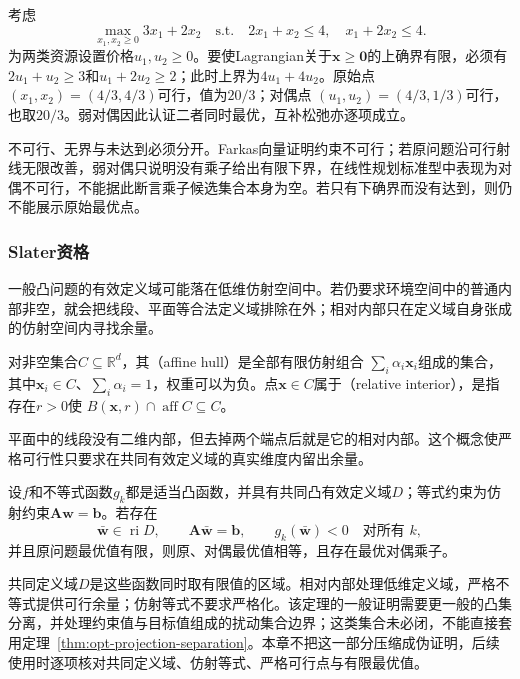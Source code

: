 \begin{example}[二维资源分配的原始与对偶证书]
\label{ex:opt-resource-lp-duality}
考虑
\[
 \max_{x_1,x_2\geq0}3x_1+2x_2
 \quad\text{s.t.}\quad
 2x_1+x_2\leq4,\quad x_1+2x_2\leq4.
\]
为两类资源设置价格$u_1,u_2\geq0$。要使Lagrangian关于$\bm x\geq\bm0$的上确界有限，必须有
$2u_1+u_2\geq3$和$u_1+2u_2\geq2$；此时上界为$4u_1+4u_2$。原始点
$(x_1,x_2)=(4/3,4/3)$可行，值为$20/3$；对偶点
$(u_1,u_2)=(4/3,1/3)$可行，也取$20/3$。弱对偶因此认证二者同时最优，互补松弛亦逐项成立。
\end{example}

不可行、无界与未达到必须分开。Farkas向量证明约束不可行；若原问题沿可行射线无限改善，弱对偶只说明没有乘子给出有限下界，在线性规划标准型中表现为对偶不可行，不能据此断言乘子候选集合本身为空。若只有下确界而没有达到，则仍不能展示原始最优点。

\subsubsection{Slater资格}

一般凸问题的有效定义域可能落在低维仿射空间中。若仍要求环境空间中的普通内部非空，就会把线段、平面等合法定义域排除在外；相对内部只在定义域自身张成的仿射空间内寻找余量。

\begin{definition}[仿射包与相对内部]
\label{def:opt-affine-hull-relative-interior}
对非空集合$C\subseteq\mathbb R^d$，其（affine hull）是全部有限仿射组合
$\sum_i\alpha_i\bm x_i$组成的集合，其中$\bm x_i\in C$、$\sum_i\alpha_i=1$，权重可以为负。点$\bm x\in C$属于（relative interior），是指存在$r>0$使
$B(\bm x,r)\cap\operatorname{aff}C\subseteq C$。
\end{definition}

平面中的线段没有二维内部，但去掉两个端点后就是它的相对内部。这个概念使严格可行性只要求在共同有效定义域的真实维度内留出余量。

\begin{theorem}[Slater条件下的强对偶]
\label{thm:opt-slater-strong-duality}
设$f$和不等式函数$g_k$都是适当凸函数，并具有共同凸有效定义域$D$；等式约束为仿射约束$\bm A\bm w=\bm b$。若存在
\[
 \bar{\bm w}\in\operatorname{ri}D,\qquad
 \bm A\bar{\bm w}=\bm b,\qquad
 g_k(\bar{\bm w})<0\quad\text{对所有 }k,
\]
并且原问题最优值有限，则原、对偶最优值相等，且存在最优对偶乘子。
\end{theorem}

共同定义域$D$是这些函数同时取有限值的区域。相对内部处理低维定义域，严格不等式提供可行余量；仿射等式不要求严格化。该定理的一般证明需要更一般的凸集分离，并处理约束值与目标值组成的扰动集合边界；这类集合未必闭，不能直接套用定理~\ref{thm:opt-projection-separation}。本章不把这一部分压缩成伪证明，后续使用时逐项核对共同定义域、仿射等式、严格可行点与有限最优值。

